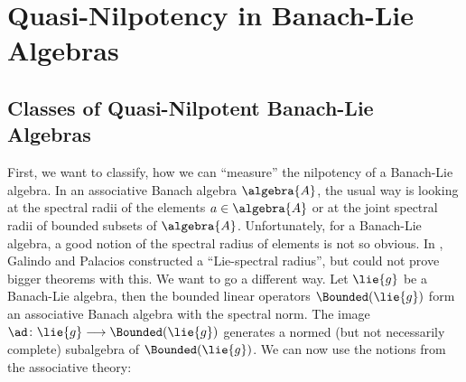 \documentclass[
11pt,                          %
english                        %
]{article}
\begin{document}
\section{Quasi-Nilpotency in Banach-Lie Algebras}
\label{sec:QuasiNilpotency}

\subsection{Classes of Quasi-Nilpotent Banach-Lie Algebras}
First, we want to classify, how we can ``measure'' the nilpotency of a Banach-Lie 
algebra. In an associative Banach algebra $\algebra{A}$, the usual way is looking 
at the spectral radii of the elements $a \in \algebra{A}$ or at the joint spectral 
radii of bounded subsets of $\algebra{A}$. Unfortunately, for a Banach-Lie algebra, 
a good notion of the spectral radius of elements is not so obvious. In 
\cite{galindo.palacios:2012a}, Galindo and Palacios constructed a ``Lie-spectral 
radius'', but could not prove bigger theorems with this. We want to go a different 
way. Let $\lie{g}$ be a Banach-Lie algebra, then the bounded linear operators 
$\Bounded(\lie{g})$ form an associative Banach algebra with the spectral norm. The 
image $\ad \colon \lie{g} \longrightarrow \Bounded(\lie{g})$ generates a normed (but 
not necessarily complete) subalgebra of $\Bounded(\lie{g})$. We can now use the 
notions from the associative theory:
\end{document}

